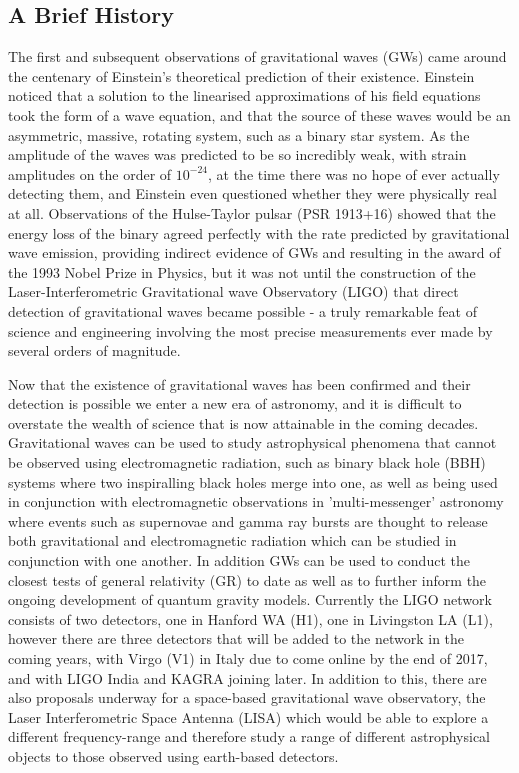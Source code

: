 \documentclass[11pt]{article}
\begin{document}
\subsection{A Brief History}
The first\cite{obs} and subsequent\cite{obs2} observations of gravitational waves (GWs) came around the centenary of Einstein's theoretical prediction of their existence\cite{eins1}\cite{eins2}. Einstein noticed that a solution to the linearised approximations of his field equations took the form of a wave equation\cite{gw1}, and that the source of these waves would be an asymmetric, massive, rotating system, such as a binary star system. As the amplitude of the waves was predicted to be so incredibly weak, with strain amplitudes on the order of $10^{-24}$, at the time there was no hope of ever actually detecting them, and Einstein even questioned whether they were physically real at all\cite{eins3}. Observations of the Hulse-Taylor pulsar (PSR 1913+16)\cite{hulse} showed that the energy loss of the binary agreed perfectly with the rate predicted by gravitational wave emission, providing indirect evidence of GWs and resulting in the award of the 1993 Nobel Prize in Physics, but it was not until the construction of the Laser-Interferometric Gravitational wave Observatory (LIGO) that direct detection of gravitational waves became possible - a truly remarkable feat of science and engineering involving the most precise measurements ever made by several orders of magnitude.

Now that the existence of gravitational waves has been confirmed and their detection is possible we enter a new era of astronomy, and it is difficult to overstate the wealth of science that is now attainable in the coming decades. Gravitational waves can be used to study astrophysical phenomena that cannot be observed using electromagnetic radiation, such as binary black hole (BBH) systems where two inspiralling black holes merge into one, as well as being used in conjunction with electromagnetic observations in 'multi-messenger' astronomy where events such as supernovae and gamma ray bursts are thought to release both gravitational and electromagnetic radiation which can be studied in conjunction with one another\cite{mm}\cite{mm2}. In addition GWs can be used to conduct the closest tests of general relativity (GR) to date\cite{gr1}\cite{gr2} as well as to further inform the ongoing development of quantum gravity models\cite{qgrav}. Currently the LIGO network consists of two detectors, one in Hanford WA (H1), one in Livingston LA (L1), however there are three detectors that will be added to the network in the coming years, with Virgo (V1) in Italy due to come online by the end of 2017, and with LIGO India and KAGRA joining later. In addition to this, there are also proposals underway for a space-based gravitational wave observatory, the Laser Interferometric Space Antenna (LISA)\cite{lisa} which would be able to explore a different frequency-range and therefore study a range of different astrophysical objects to those observed using earth-based detectors.
\end{document}
